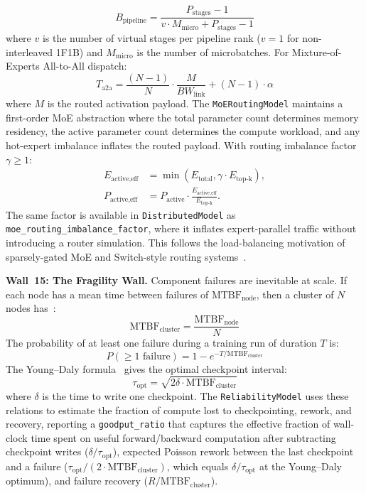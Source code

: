 \documentclass[10pt,twocolumn]{article}
\begin{document}
\begin{equation}
\label{eq:bubble}
B_{\text{pipeline}} = \frac{P_{\text{stages}} - 1}{v \cdot M_{\text{micro}} + P_{\text{stages}} - 1}
\end{equation}
where $v$ is the number of virtual stages per pipeline rank ($v=1$ for non-interleaved 1F1B) and $M_{\text{micro}}$ is the number of microbatches. For Mixture-of-Experts All-to-All dispatch:
\begin{equation}
\label{eq:alltoall}
T_{\text{a2a}} = \frac{(N-1)}{N} \cdot \frac{M}{BW_{\text{link}}} + (N-1) \cdot \alpha
\end{equation}
where $M$ is the routed activation payload. The \texttt{MoERoutingModel} maintains a first-order MoE abstraction where the total parameter count determines memory residency, the active parameter count determines the compute workload, and any hot-expert imbalance inflates the routed payload. With routing imbalance factor $\gamma \ge 1$:
\begin{align}
\label{eq:moe-imbalance}
E_{\text{active,eff}} &= \min(E_{\text{total}}, \gamma \cdot E_{\text{top-k}}), \\
P_{\text{active,eff}} &= P_{\text{active}} \cdot
\frac{E_{\text{active,eff}}}{E_{\text{top-k}}}.
\end{align}
The same factor is available in \texttt{DistributedModel} as \texttt{moe\_routing\_imbalance\_factor}, where it inflates expert-parallel traffic without introducing a router simulation. This follows the load-balancing motivation of sparsely-gated MoE and Switch-style routing systems~\citep{shazeer2017outrageously,fedus2022switch,lepikhin2020gshard}.

\textbf{Wall~15: The Fragility Wall.} Component failures are inevitable at scale. If each node has a mean time between failures of $\text{MTBF}_{\text{node}}$, then a cluster of $N$ nodes has~\citep{daly2006}:
\begin{equation}
\label{eq:mtbf}
\text{MTBF}_{\text{cluster}} = \frac{\text{MTBF}_{\text{node}}}{N}
\end{equation}
The probability of at least one failure during a training run of duration $T$ is:
\begin{equation}
\label{eq:pfail}
P(\geq 1 \text{ failure}) = 1 - e^{-T / \text{MTBF}_{\text{cluster}}}
\end{equation}
The Young--Daly formula~\citep{young1974, daly2006} gives the optimal checkpoint interval:
\begin{equation}
\label{eq:youngdaly}
\tau_{\text{opt}} = \sqrt{2 \delta \cdot \text{MTBF}_{\text{cluster}}}
\end{equation}
where $\delta$ is the time to write one checkpoint. The \texttt{ReliabilityModel} uses these relations to estimate the fraction of compute lost to checkpointing, rework, and recovery, reporting a \texttt{goodput\_ratio} that captures the effective fraction of wall-clock time spent on useful forward/backward computation after subtracting checkpoint writes ($\delta / \tau_{\text{opt}}$), expected Poisson rework between the last checkpoint and a failure ($\tau_{\text{opt}} / (2 \cdot \text{MTBF}_{\text{cluster}})$, which equals $\delta / \tau_{\text{opt}}$ at the Young--Daly optimum), and failure recovery ($R / \text{MTBF}_{\text{cluster}}$).
\end{document}
